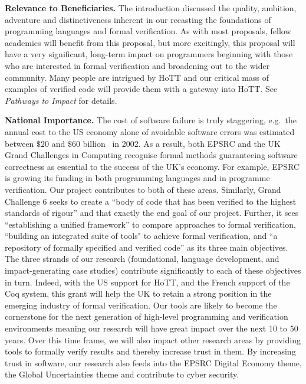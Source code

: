 \documentclass[a4paper,11pt]{article}
\newcommand{\eg}{{e.g.}\ }
\begin{document}
\vspace*{-0.1in}


{\bf Relevance to Beneficiaries.} The introduction discussed the
quality, ambition, adventure and distinctiveness inherent in our
recasting the foundations of programming languages and formal
verification. As with most proposals, fellow academics will benefit
from this proposal, but more excitingly, this proposal will have a
very significant, long-term impact on programmers beginning with those
who are interested in formal verification and broadening out to the
wider community. Many people are
intrigued by HoTT and our critical mass of examples of verified code
will provide them with a gateway into HoTT. See {\em
  Pathways to Impact} for details. 
 

{\bf National Importance.} %
The cost of software failure is truly staggering, \eg the annual cost
to the US economy alone of avoidable software errors was estimated between
$\$ 20$ and $\$60$ billion~\cite{grandchallenges} in 2002.  As a
result, both EPSRC and the UK Grand Challenges in Computing
recognise formal methods guaranteeing software correctness as
essential to the success of the UK's economy. For example, EPSRC is
growing its funding in both programming languages and in programme
verification. Our project contributes to both of these
areas. Similarly, Grand Challenge 6 seeks to create a ``body of code
that has been verified to the highest standards of rigour'' and that
exactly the end goal of our project. Further, it sees ``establishing a
unified framework'' to compare approaches to formal verification,
``building an integrated suite of tools" to achieve formal
verification, and ``a repository of formally specified and verified
code'' as its three main objectives. The three strands of our research
(foundational, language development, and impact-generating case
studies) contribute significantly to each of these objectives in turn.
Indeed, with the US support for HoTT, and the French support of the
Coq system, this grant will help the UK to retain a strong position in
the emerging industry of formal verification. Our tools are likely to become the
cornerstone for the next generation of high-level programming
and verification environments meaning our research will
have great impact over the next 10 to 50 years. Over this time frame,
we will also impact other research areas by providing tools to
formally verify results and thereby increase trust in them. By
increasing trust in software, our research also feeds into the EPSRC
Digital Economy theme, the Global Uncertainties 
theme and contribute
to cyber security.
\end{document}
